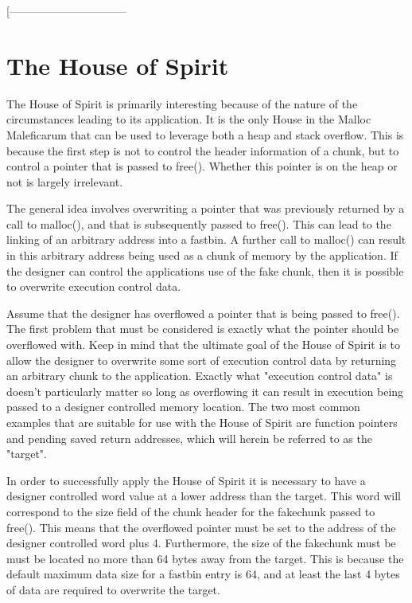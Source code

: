 \documentclass[12pt]{article}
\begin{document}
[--------------------------------

\section{The House of Spirit}


The House of Spirit is primarily interesting because of the nature
of the circumstances leading to its application. It is the only
House in the Malloc Maleficarum that can be used to leverage both a
heap and stack overflow. This is because the first step is not to
control the header information of a chunk, but to control a pointer
that is passed to free(). Whether this pointer is on the heap or
not is largely irrelevant.
\newline


The general idea involves overwriting a pointer that was previously
returned by a call to malloc(), and that is subsequently passed to
free(). This can lead to the linking of an arbitrary address into a
fastbin. A further call to malloc() can result in this arbitrary
address being used as a chunk of memory by the application. If the
designer can control the applications use of the fake chunk, then
it is possible to overwrite execution control data.
\newline


Assume that the designer has overflowed a pointer that is being
passed to free(). The first problem that must be considered is
exactly what the pointer should be overflowed with. Keep in mind
that the ultimate goal of the House of Spirit is to allow the
designer to overwrite some sort of execution control data by
returning an arbitrary chunk to the application. Exactly what
"execution control data" is doesn't particularly matter so long as
overflowing it can result in execution being passed to a designer
controlled memory location. The two most common examples that are
suitable for use with the House of Spirit are function pointers and
pending saved return addresses, which will herein be referred to as
the "target".
\newline


In order to successfully apply the House of Spirit it is necessary
to have a designer controlled word value at a lower address than
the target. This word will correspond to the size field of the
chunk header for the fakechunk passed to free(). This means that
the overflowed pointer must be set to the address of the designer
controlled word plus 4. Furthermore, the size of the fakechunk must
be must be located no more than 64 bytes away from the target. This
is because the default maximum data size for a fastbin entry is 64,
and at least the last 4 bytes of data are required to overwrite the
target.
\newline
\end{document}
